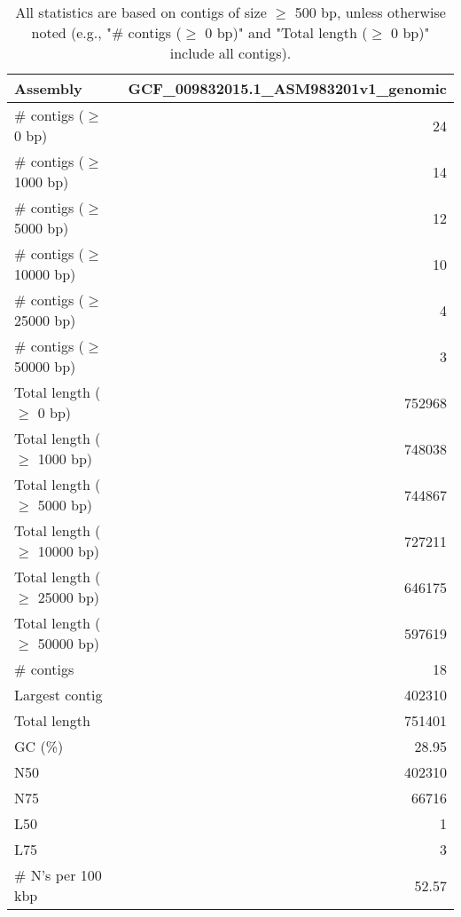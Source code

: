\documentclass[12pt,a4paper]{article}
\begin{document}
\begin{table}[ht]
\begin{center}
\caption{All statistics are based on contigs of size $\geq$ 500 bp, unless otherwise noted (e.g., "\# contigs ($\geq$ 0 bp)" and "Total length ($\geq$ 0 bp)" include all contigs).}
\begin{tabular}{|l*{1}{|r}|}
\hline
Assembly & GCF\_009832015.1\_ASM983201v1\_genomic \\ \hline
\# contigs ($\geq$ 0 bp) & 24 \\ \hline
\# contigs ($\geq$ 1000 bp) & 14 \\ \hline
\# contigs ($\geq$ 5000 bp) & 12 \\ \hline
\# contigs ($\geq$ 10000 bp) & 10 \\ \hline
\# contigs ($\geq$ 25000 bp) & 4 \\ \hline
\# contigs ($\geq$ 50000 bp) & 3 \\ \hline
Total length ($\geq$ 0 bp) & 752968 \\ \hline
Total length ($\geq$ 1000 bp) & 748038 \\ \hline
Total length ($\geq$ 5000 bp) & 744867 \\ \hline
Total length ($\geq$ 10000 bp) & 727211 \\ \hline
Total length ($\geq$ 25000 bp) & 646175 \\ \hline
Total length ($\geq$ 50000 bp) & 597619 \\ \hline
\# contigs & 18 \\ \hline
Largest contig & 402310 \\ \hline
Total length & 751401 \\ \hline
GC (\%) & 28.95 \\ \hline
N50 & 402310 \\ \hline
N75 & 66716 \\ \hline
L50 & 1 \\ \hline
L75 & 3 \\ \hline
\# N's per 100 kbp & 52.57 \\ \hline
\end{tabular}
\end{center}
\end{table}
\end{document}
